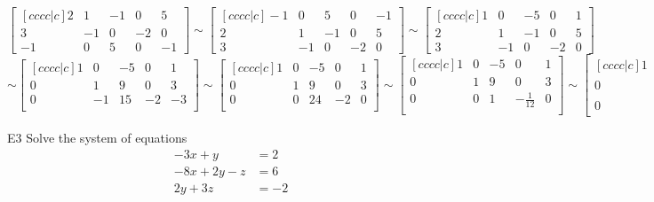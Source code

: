 \documentclass{sbgLAexam}
\begin{document}
\begin{solution}
$$\begin{bmatrix}[cccc|c]
 2 & 1 & -1 & 0 & 5 \\
 3 & -1 & 0 & -2 & 0 \\
 -1 & 0 & 5 & 0 & -1
\end{bmatrix} \sim
\begin{bmatrix}[cccc|c]
 -1 & 0 & 5 & 0 & -1  \\
 2 & 1 & -1 & 0 & 5 \\
 3 & -1 & 0 & -2 & 0
\end{bmatrix} \sim
\begin{bmatrix}[cccc|c]
 1 & 0 & -5 & 0 & 1 \\
 2 & 1 & -1 & 0 & 5 \\
 3 & -1 & 0 & -2 & 0
\end{bmatrix} $$
$$\sim
\begin{bmatrix}[cccc|c]
 1 & 0 & -5 & 0 & 1  \\
 0 & 1 & 9 & 0 & 3 \\
 0 & -1 & 15 & -2 & -3 \\
\end{bmatrix} \sim
\begin{bmatrix}[cccc|c]
 1 & 0 & -5 & 0 & 1  \\
 0 & 1 & 9 & 0 & 3 \\
 0 & 0 & 24 & -2 & 0 \\
\end{bmatrix} \sim
\begin{bmatrix}[cccc|c]
 1 & 0 & -5 & 0 & 1 \\
 0 & 1 & 9 & 0 & 3 \\
 0 & 0 & 1 & -\frac{1}{12} & 0 \\
\end{bmatrix} \sim
\begin{bmatrix}[cccc|c]
1 & 0 & 0 & -\frac{5}{12} & 1 \\
 0 & 1 & 0 & \frac{3}{4} & 3 \\
 0 & 0 & 1 & -\frac{1}{12} & 0
\end{bmatrix}$$
\end{solution}

\begin{extract}\newpage\end{extract}
\begin{problem}{E3}
Solve the system of equations
\begin{align*}
-3x +y &= 2\\
-8x+2y-z &= 6 \\
2y+3z &= -2
\end{align*}


\end{problem}
\end{document}
